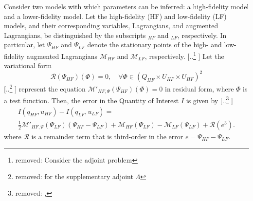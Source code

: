 \documentclass[review]{siamart0516}
\providecommand{\DIFaddtex}[1]{{\protect\color{blue} \sf #1}} %
\providecommand{\DIFdeltex}[1]{{\protect\color{red} [..\footnote{removed: #1} ]}} %
\providecommand{\DIFaddbegin}{} %
\providecommand{\DIFaddend}{} %
\providecommand{\DIFdelbegin}{} %
\providecommand{\DIFdelend}{} %
\providecommand{\DIFadd}[1]{\texorpdfstring{\DIFaddtex{#1}}{#1}} %
\providecommand{\DIFdel}[1]{\texorpdfstring{\DIFdeltex{#1}}{}} %
\newcommand{\DIFscaledelfig}{0.5}
\newlength{\DIFdelgraphicswidth} %
\newlength{\DIFdelgraphicsheight} %
\newcommand{\DIFaddincludegraphics}[2][]{{\color{blue}\fbox{\DIFOincludegraphics[#1]{#2}}}} %
\newcommand{\DIFdelincludegraphics}[2][]{%
\sbox{\DIFdelgraphicsbox}{\DIFOincludegraphics[#1]{#2}}%
\settoboxwidth{\DIFdelgraphicswidth}{\DIFdelgraphicsbox} %
\settoboxtotalheight{\DIFdelgraphicsheight}{\DIFdelgraphicsbox} %
\scalebox{\DIFscaledelfig}{%
\parbox[b]{\DIFdelgraphicswidth}{\usebox{\DIFdelgraphicsbox}\\[-\baselineskip] \rule{\DIFdelgraphicswidth}{0em}}\llap{\resizebox{\DIFdelgraphicswidth}{\DIFdelgraphicsheight}{%
\setlength{\unitlength}{\DIFdelgraphicswidth}%
\begin{picture}(1,1)%
\thicklines\linethickness{2pt} %
{\color[rgb]{1,0,0}\put(0,0){\framebox(1,1){}}}%
{\color[rgb]{1,0,0}\put(0,0){\line( 1,1){1}}}%
{\color[rgb]{1,0,0}\put(0,1){\line(1,-1){1}}}%
\end{picture}%
}\hspace*{3pt}}} %
} %
\DeclareRobustCommand{\DIFaddbegin}{\DIFOaddbegin \let\includegraphics\DIFaddincludegraphics} %
\DeclareRobustCommand{\DIFaddend}{\DIFOaddend \let\includegraphics\DIFOincludegraphics} %
\DeclareRobustCommand{\DIFdelbegin}{\DIFOdelbegin \let\includegraphics\DIFdelincludegraphics} %
\DeclareRobustCommand{\DIFdelend}{\DIFOaddend \let\includegraphics\DIFOincludegraphics} %
\begin{document}
\begin{proposition}
Consider two models with which parameters can be inferred: a high-fidelity model and a lower-fidelity model. Let the high-fidelity (HF) and low-fidelity (LF) models, and their corresponding variables, Lagrangians, and augmented Lagrangians, be distinguished by the subscripts $_{HF}$ and $_{LF}$, respectively. In particular, let $\Psi_{HF}$ and $\Psi_{LF}$ denote the stationary points of the high- and low- fidelity augmented Lagrangians $\mathcal{M}_{HF}$ and $\mathcal{M}_{LF}$, respectively. \DIFdelbegin \DIFdel{Consider the adjoint problem
}\DIFdelend \DIFaddbegin \DIFadd{Let the variational form
}\DIFaddend %
\DIFdelbegin %
\DIFdelend \DIFaddbegin \begin{equation}
\mathscr{R}(\Psi_{HF})(\Phi)=0,\quad\forall\Phi\in(Q_{HF}\times U_{HF}\times U_{HF})^2
\label{eq:supadjsys}
\end{equation}
\DIFaddend %
\DIFdelbegin \DIFdel{for the supplementary adjoint $\Lambda$}\DIFdelend \DIFaddbegin \DIFadd{represent the equation $\mathcal{M}'_{HF,\Psi}(\Psi_{HF})(\Phi)=0$ in residual form}\DIFaddend , where $\Phi$ is a test function.
Then, the error in the Quantity of Interest $I$ is given by
\DIFdelbegin \DIFdel{,
}\DIFdelend %
\DIFdelbegin %
\DIFdelend \DIFaddbegin \begin{multline}
\label{eq:semifinErrExp}
I(q_{HF},u_{HF})-I(q_{LF},u_{LF})=\\\frac{1}{2}\mathcal{M}'_{HF,\Psi}(\Psi_{LF})(\Psi_{HF}-\Psi_{LF})+\mathcal{M}_{HF}(\Psi_{LF})-\mathcal{M}_{LF}(\Psi_{LF})+\mathcal{R}(e^3)\textrm{.}
\end{multline}
\DIFaddend %
where $\mathcal{R}$ is a remainder term that is third-order in the error $e=\Psi_{HF}-\Psi_{LF}$.
\DIFdelbegin %
\DIFdelend \DIFaddbegin \end{proposition}
\end{document}
